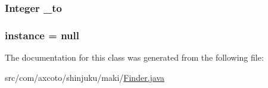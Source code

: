 \hypertarget{classcom_1_1axcoto_1_1shinjuku_1_1maki_1_1_finder_a353ea6b9e735fa762738888980c9708b}{
\subsubsection[{\-\_\-to}]{\setlength{\rightskip}{0pt plus 5cm}\-Integer {\bf \-\_\-to}}}\label{classcom_1_1axcoto_1_1shinjuku_1_1maki_1_1_finder_a353ea6b9e735fa762738888980c9708b}
\hypertarget{classcom_1_1axcoto_1_1shinjuku_1_1maki_1_1_finder_a2a7ac56cbdddc2652772ef5adac6d364}{
\subsubsection[{instance}]{ {\bf instance} = null}}\label{classcom_1_1axcoto_1_1shinjuku_1_1maki_1_1_finder_a2a7ac56cbdddc2652772ef5adac6d364}


\-The documentation for this class was generated from the following file\-:\begin{DoxyCompactItemize}
\item 
src/com/axcoto/shinjuku/maki/\hyperlink{_finder_8java}{\-Finder.\-java}\end{DoxyCompactItemize}
